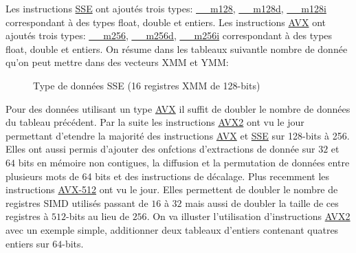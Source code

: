 \documentclass[12pt]{article}
\begin{document}
\vspace{1cm}
Les instructions \url{SSE} ont ajoutés trois types: \url{__m128}, \url{__m128d}, \url{__m128i} correspondant à des types float, double et entiers.
\newline
Les instructions \url{AVX} ont ajoutés trois types: \url{__m256},  \url{__m256d}, \url{__m256i} correspondant à des types float, double et entiers.
\newline
On résume dans les tableaux suivantle nombre de donnée qu'on peut mettre dans des vecteurs XMM et YMM:



\begin{figure}[h!]
    \centering
{}
    \caption{Type de données SSE (16 registres XMM de 128-bits)}
    \label{fig:SSE table}
\end{figure}

Pour des données utilisant un type \url{AVX} il suffit de doubler le nombre de données du tableau précédent. Par la suite les instructions \url{AVX2} ont vu le jour permettant d'etendre la majorité des instructions \url{AVX} et \url{SSE} sur 128-bits à 256. Elles ont aussi permis d'ajouter des onfctions d'extractions de donnée sur $32$ et $64$ bits en mémoire non contigues, la diffusion et la permutation de données entre plusieurs mots de 64 bits et des instructions de décalage. Plus recemment les instructions \url{AVX-512} ont vu le jour. Elles permettent de doubler le nombre de registres SIMD utilisés passant de $16$ à $32$ mais aussi de doubler la taille de ces registres à $512$-bits au lieu de $256$.
\newline
On va illuster l'utilisation d'instructions \url{AVX2} avec un exemple simple, additionner deux tableaux d'entiers contenant quatres entiers sur $64$-bits.
\end{document}
